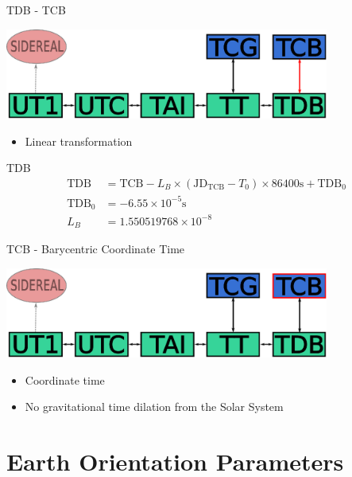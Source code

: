 \documentclass[14pt,table,t, c]{beamer}
\begin{document}
\begin{frame}{TDB - TCB}
\begin{center}
	\includegraphics[width=0.8\textwidth]{figure/tdb_tcb}
\end{center}
\vspace*{-\baselineskip}
\begin{itemize}
\item Linear transformation
\end{itemize}
\begin{block}{TDB}
\small
\vspace*{-\baselineskip}\setlength\belowdisplayskip{0pt}\setlength\abovedisplayskip{0pt}
\begin{align*}
\text{TDB} &= \text{TCB} - L_B \times \left( \text{JD}_\text{TCB} - T_0\right) \times 86400 \text{s} + \text{TDB}_0\\
\text{TDB}_0 &= -6.55 \times 10^{-5} \text{s} \\
L_B &= 1.550519768 \times 10^{-8}
\end{align*}
\end{block}
\end{frame}

\begin{frame}{TCB - Barycentric Coordinate Time}
\begin{center}
	\includegraphics[width=0.8\textwidth]{figure/tcb}
\end{center}
\begin{itemize}
\item Coordinate time
\item No gravitational time dilation from the Solar System
\end{itemize}
\end{frame}

\part{Earth Orientation Parameters}
\end{document}

